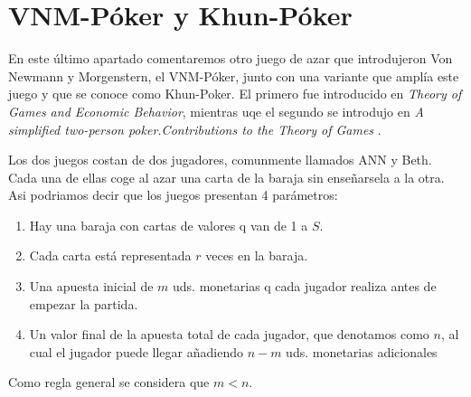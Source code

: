 \documentclass[12pt,a4paper,]{book}
\title{}
\author{Nombre Completo Autor}
\date{18/11/2021}
\def\ifdoblecara{} %
\def\ifprincipal{} %
\let\ifprincipal\undefined %
\numberwithin{dummy}{section}
\theoremstyle{ocrenumbox}
\theoremstyle{blacknumex}
\theoremstyle{blacknumbox}
\theoremstyle{ocrenum}
\theoremstyle{ocrenum}
\begin{document}




\raggedbottom

\ifdefined\ifprincipal
\else
\setlength{\parindent}{1em}
\pagestyle{fancy}
\setcounter{tocdepth}{4}
\tableofcontents

\fi

\ifdefined\ifdoblecara
\fancyhead{}{}
\fancyhead[LE,RO]{\scriptsize\rightmark}
\fancyfoot[LO,RE]{\scriptsize\slshape \leftmark}
\fancyfoot[C]{}
\fancyfoot[LE,RO]{\footnotesize\thepage}
\else
\fancyhead{}{}
\fancyhead[RO]{\scriptsize\rightmark}
\fancyfoot[LO]{\scriptsize\slshape \leftmark}
\fancyfoot[C]{}
\fancyfoot[RO]{\footnotesize\thepage}
\fi

\renewcommand{\headrulewidth}{0.4pt}
\renewcommand{\footrulewidth}{0.4pt}

\hypertarget{Seccion5}{%
\chapter{VNM-Póker y Khun-Póker}\label{Seccion5}}

En este último apartado comentaremos otro juego de azar que introdujeron
Von Newmann y Morgenstern, el VNM-Póker, junto con una variante que
amplía este juego y que se conoce como Khun-Poker. El primero fue
introducido en \emph{Theory of Games and Economic Behavior}, mientras
uqe el segundo se introdujo en \emph{A simplified two-person
poker.Contributions to the Theory of Games} .

Los dos juegos costan de dos jugadores, comunmente llamados ANN y Beth.
Cada una de ellas coge al azar una carta de la baraja sin enseñarsela a
la otra. Asi podriamos decir que los juegos presentan 4 parámetros:

\begin{enumerate}
\def\labelenumi{\arabic{enumi}.}
\item
  Hay una baraja con cartas de valores q van de 1 a \(S\).
\item
  Cada carta está representada \(r\) veces en la baraja.
\item
  Una apuesta inicial de \(m\) uds. monetarias q cada jugador realiza
  antes de empezar la partida.
\item
  Un valor final de la apuesta total de cada jugador, que denotamos como
  \(n\), al cual el jugador puede llegar añadiendo \(n-m\) uds.
  monetarias adicionales
\end{enumerate}

Como regla general se considera que \(m<n\).
\end{document}
